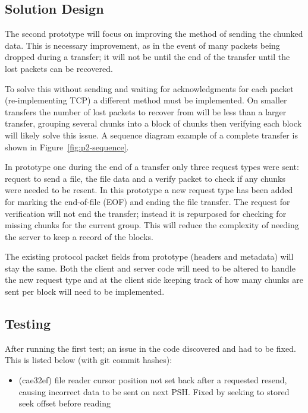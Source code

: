\subsection*{Solution Design}
The second prototype will focus on improving the method of sending the chunked data. This is necessary improvement, as in the event of many packets being dropped during a transfer; it will not be until the end of the transfer until the lost packets can be recovered.

To solve this without sending and waiting for acknowledgments for each packet (re-implementing TCP) a different method must be implemented. On smaller transfers the number of lost packets to recover from will be less than a larger transfer, grouping several chunks into a block of chunks then verifying each block will likely solve this issue. A sequence diagram example of a complete transfer is shown in Figure~\ref{fig:p2-sequence}.

In prototype one during the end of a transfer only three request types were sent: request to send a file, the file data and a verify packet to check if any chunks were needed to be resent. In this prototype a new request type has been added for marking the end-of-file (EOF) and ending the file transfer. The request for verification will not end the transfer; instead it is repurposed for checking for missing chunks for the current group. This will reduce the complexity of needing the server to keep a record of the blocks.

The existing protocol packet fields from prototype (headers and metadata) will stay the same. Both the client and server code will need to be altered to handle the new request type and at the client side keeping track of how many chunks are sent per block will need to be implemented.


\subsection*{Testing}
After running the first test; an issue in the code discovered and had to be fixed. This is listed below (with git commit hashes):

\begin{itemize}
    \item (cae32ef) file reader cursor position not set back after a requested resend, causing incorrect data to be sent on next PSH. Fixed by seeking to stored seek offset before reading
\end{itemize}

